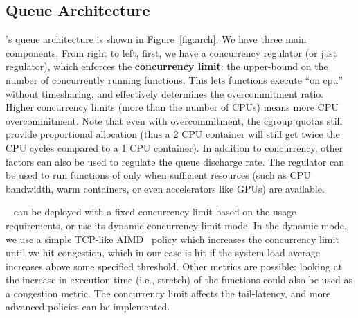 \subsection{Queue Architecture}
\label{sec:q:arch}

\sysname's queue architecture is shown in Figure~\ref{fig:arch}.
We have three main components.
%
From right to left, first, we have a concurrency regulator (or just regulator), which enforces the \textbf{concurrency limit}: the  upper-bound on the number of concurrently running functions. 
%
This lets functions execute ``on cpu'' without timesharing, and effectively determines the overcommitment ratio.
Higher concurrency limits (more than the number of CPUs) means  more CPU overcommitment.
Note that even with overcommitment, the cgroup quotas still provide proportional allocation (thus a 2 CPU container will still get twice the CPU cycles compared to a 1 CPU container). 
%
In addition to concurrency, other factors can also be used to regulate the queue discharge rate. 
The regulator can be used to run functions of only when sufficient resources (such as CPU bandwidth, warm containers, or even accelerators like GPUs) are available. 


\sysname~ can be deployed with a fixed concurrency limit based on the usage requirements, or use its dynamic concurrency limit mode. 
In the dynamic mode, we use a simple TCP-like AIMD~\cite{yang2000general} policy which increases the concurrency limit until we hit congestion, which in our case is hit if the system load average increases above some specified threshold. 
Other metrics are possible: looking at the increase in execution time (i.e., stretch) of the functions could also be used as a congestion metric.
The concurrency limit affects the tail-latency, and more advanced policies can be implemented. 


\begin{comment}
Having the container map also allows us to implement \textbf{concurrent cold start mitigation}.
If the function at the head of the queue has no warm containers available, and one of its instantiations is running, then we put the function back in the queue.
As a function's warm start is typically orders of magnitude shorter than cold starts, it is better for it to wait for warm container than to cold start one.
We implement this by asking the container pool for a warm container, and if it fails to give us one we can re-queue the invocation for the future.
Optionally, we can allow for a cold start to increase the number of warm containers for a function, naturally scaling if there is an increase in frequency.
\end{comment}

